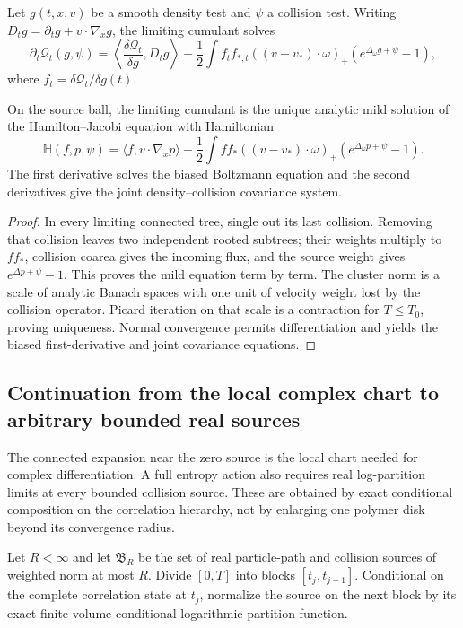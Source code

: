 Let \(g(t,x,v)\) be a smooth density test and \(\psi\) a collision test.
Writing \(D_tg=\partial_tg+v\cdot\nabla_xg\), the limiting cumulant solves
\[
 \partial_t\mathcal Q_t(g,\psi)
 =\left\langle
 \frac{\delta\mathcal Q_t}{\delta g},D_tg
 \right\rangle
 +\frac12\int f_t f_{*,t}
 ((v-v_*)\cdot\omega)_+
 \left(e^{\Delta_\omega g+\psi}-1\right),
\]
where \(f_t=\delta\mathcal Q_t/\delta g(t)\).

\begin{theorem}
\label{thm:r3-b2-hj}
On the source ball, the limiting cumulant is the unique analytic mild solution
of the Hamilton--Jacobi equation with Hamiltonian
\[
 \mathbb H(f,p,\psi)
 =\langle f,v\cdot\nabla_xp\rangle
 +\frac12\int ff_*((v-v_*)\cdot\omega)_+
 \left(e^{\Delta_\omega p+\psi}-1\right).
\]
The first derivative solves the biased Boltzmann equation and the second
derivatives give the joint density--collision covariance system.
\end{theorem}

\begin{proof}
In every limiting connected tree, single out its last collision.  Removing
that collision leaves two independent rooted subtrees; their weights multiply
to \(f f_*\), collision coarea gives the incoming flux, and the source weight
gives \(e^{\Delta p+\psi}-1\).  This proves the mild equation term by term.
The cluster norm is a scale of analytic Banach spaces with one unit of
velocity weight lost by the collision operator.  Picard iteration on that
scale is a contraction for \(T\le T_0\), proving uniqueness.  Normal
convergence permits differentiation and yields the biased first-derivative and
joint covariance equations.
\end{proof}

\subsection{Continuation from the local complex chart to arbitrary bounded real sources}

The connected expansion near the zero source is the local chart needed for
complex differentiation.  A full entropy action also requires real
log-partition limits at every bounded collision source.  These are obtained by
exact conditional composition on the correlation hierarchy, not by enlarging
one polymer disk beyond its convergence radius.

Let \(R<\infty\) and let \(\mathfrak B_R\) be the set of real particle-path
and collision sources of weighted norm at most \(R\).  Divide \([0,T]\) into
blocks \([t_j,t_{j+1}]\).  Conditional on the complete correlation state at
\(t_j\), normalize the source on the next block by its exact finite-volume
conditional logarithmic partition function.

